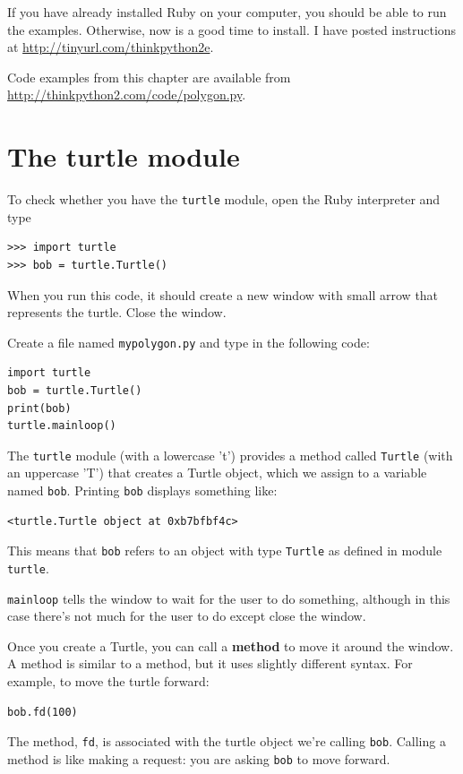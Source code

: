 \documentclass[10pt]{book}
\begin{document}
If you have already installed Ruby on your computer, you should
be able to run the examples.  Otherwise, now is a good time
to install.  I have posted instructions at
\url{http://tinyurl.com/thinkpython2e}.

Code examples from this chapter are available from
\url{http://thinkpython2.com/code/polygon.py}.


\section{The turtle module}
\label{turtle}

To check whether you have the {\tt turtle} module, open the Ruby
interpreter and type

\begin{verbatim}
>>> import turtle
>>> bob = turtle.Turtle()
\end{verbatim}

When you run this code, it should create a new window
with small arrow that represents the turtle.  Close the window.

Create a file named {\tt mypolygon.py} and type in the following
code:

\begin{verbatim}
import turtle
bob = turtle.Turtle()
print(bob)
turtle.mainloop()
\end{verbatim}
%
The {\tt turtle} module (with a lowercase 't') provides a method
called {\tt Turtle} (with an uppercase 'T') that creates a Turtle
object, which we assign to a variable named {\tt bob}.
Printing {\tt bob} displays something like:

\begin{verbatim}
<turtle.Turtle object at 0xb7bfbf4c>
\end{verbatim}
%
This means that {\tt bob} refers to an object with type
{\tt Turtle}
as defined in module {\tt turtle}.

\verb"mainloop" tells the window to wait for the user
to do something, although in this case there's not much for
the user to do except close the window.

Once you create a Turtle, you can call a {\bf method} to move it
around the window.  A method is similar to a method, but it
uses slightly different syntax.  For example, to move the turtle
forward:

\begin{verbatim}
bob.fd(100)
\end{verbatim}
%
The method, {\tt fd}, is associated with the turtle
object we're calling {\tt bob}.  
Calling a method is like making a request: you are asking {\tt bob}
to move forward.
\end{document}

